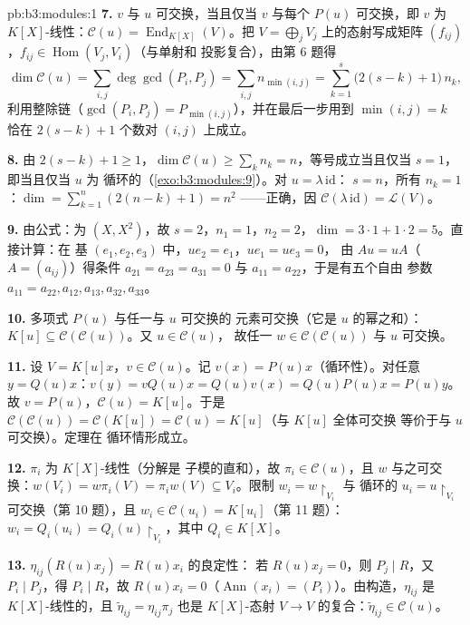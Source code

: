 \begin{solution}{pb:b3:modules:1}
\textbf{7.} $v$ 与 $u$ 可交换，当且仅当 $v$ 与每个
$P(u)$ 可交换，即 $v$ 为 $K[X]$-线性：$\mathcal C(u) =
\operatorname{End}_{K[X]}(V)$。把 $V =
\bigoplus_j V_j$ 上的态射写成矩阵 $(f_{ij})$，$f_{ij} \in
\operatorname{Hom}(V_j, V_i)$（与单射和
投影复合），由第 6 题得
\[
\dim \mathcal C(u) = \sum_{i,j} \deg\gcd(P_i, P_j)
= \sum_{i,j} n_{\min(i,j)}
= \sum_{k=1}^{s} \bigl(2(s - k) + 1\bigr)\,n_k ,
\]
利用整除链（$\gcd(P_i, P_j) =
P_{\min(i,j)}$），并在最后一步用到 $\min(i,j) = k$
恰在 $2(s - k) + 1$ 个数对 $(i, j)$ 上成立。

\textbf{8.} 由 $2(s-k)+1 \geq 1$，$\dim\mathcal C(u) \geq
\sum_k n_k = n$，等号成立当且仅当 $s = 1$，即当且仅当 $u$ 为
循环的（\cref{exo:b3:modules:9}）。对 $u = \lambda\,\mathrm{id}$：
$s = n$，所有 $n_k = 1$：$\dim = \sum_{k=1}^n (2(n-k)+1) = n^2$
——正确，因 $\mathcal C(\lambda\,\mathrm{id}) = \mathcal
L(V)$。

\textbf{9.} 由公式：为 $(X, X^2)$，故 $s = 2$，$n_1 =
1$，$n_2 = 2$，$\dim = 3\cdot1 + 1\cdot2 = 5$。直接计算：在
基 $(e_1, e_2, e_3)$ 中，$u e_2 = e_1$，$ue_1 = ue_3 = 0$，
由 $Au = uA$（$A = (a_{ij})$）得条件
$a_{21} = a_{23} = a_{31} = 0$ 与 $a_{11} = a_{22}$，于是有五个自由
参数 $a_{11}{=}a_{22}, a_{12}, a_{13}, a_{32}, a_{33}$。

\textbf{10.} 多项式 $P(u)$ 与任一与 $u$ 可交换的
元素可交换（它是 $u$ 的幂之和）：$K[u]
\subseteq \mathcal C(\mathcal C(u))$。又 $u \in \mathcal C(u)$，
故任一 $w \in \mathcal C(\mathcal C(u))$ 与 $u$ 可交换。

\textbf{11.} 设 $V = K[u]x$，$v \in \mathcal C(u)$。记
$v(x) = P(u)x$（循环性）。对任意 $y = Q(u)x$：$v(y) =
vQ(u)x = Q(u)v(x) = Q(u)P(u)x = P(u)y$。故 $v = P(u)$，$\mathcal
C(u) = K[u]$。于是 $\mathcal C(\mathcal C(u)) = \mathcal
C(K[u]) = \mathcal C(u) = K[u]$（与 $K[u]$ 全体可交换
等价于与 $u$ 可交换）。定理在
循环情形成立。

\textbf{12.} $\pi_i$ 为 $K[X]$-线性（分解是
子模的直和），故 $\pi_i \in \mathcal C(u)$，且 $w$
与之可交换：$w(V_i) = w\pi_i(V) = \pi_i w(V) \subseteq
V_i$。限制 $w_i = w\restriction_{V_i}$ 与
循环的 $u_i = u\restriction_{V_i}$ 可交换（第 10 题），且 $w_i
\in \mathcal C(u_i) = K[u_i]$（第 11 题）：$w_i = Q_i(u_i) =
Q_i(u)\restriction_{V_i}$，其中 $Q_i \in K[X]$。

\textbf{13.} $\eta_{ij}(R(u)x_j) = R(u)x_i$ 的良定性：
若 $R(u)x_j = 0$，则 $P_j \mid R$，又 $P_i \mid P_j$，得
$P_i \mid R$，故 $R(u)x_i = 0$（$\operatorname{Ann}(x_i) =
(P_i)$）。由构造，$\eta_{ij}$ 是 $K[X]$-线性的，且
$\tilde\eta_{ij} = \eta_{ij}\pi_j$ 也是
$K[X]$-态射 $V \to V$ 的复合：$\tilde\eta_{ij} \in \mathcal
C(u)$。


\end{solution}
